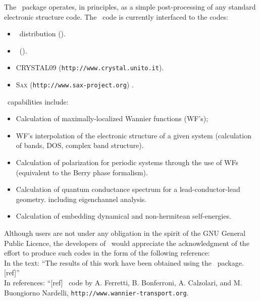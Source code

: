 \noindent The \WANT\ package operates, in principles, as a simple
post-processing of any standard electronic structure code. The \WANT\ code
is currently interfaced to the codes: 
\begin{itemize}
 \item[\mydot]  \QUANTUMESPRESSO\ distribution (\QUANTUMESPRESSOURL).
 \item[\mydot]  \ABINIT\ (\ABINITURL).
 \item[\mydot]  \textsc{CRYSTAL09} ({\tt http://www.crystal.unito.it}).
 \item[\mydot]  \textsc{Sax} ({\tt http://www.sax-project.org}) .
\end{itemize}

\noindent \WANT\ capabilities include:
\begin{itemize}
\item[\mydot]   Calculation of maximally-localized Wannier functions (WF's);
\item[\mydot]   WF's interpolation of the electronic structure of a given system
                (calculation of bands, DOS, complex band structure).
\item[\mydot]   Calculation of polarization for periodic systems through the
                use of WFs (equivalent to the Berry phase formalism).
\item[\mydot]   Calculation of quantum conductance spectrum 
                for a lead-conductor-lead geometry. including
                eigenchannel analysis.
\item[\mydot]   Calculation of embedding dynamical and non-hermitean self-energies.
\end{itemize}

\vspace{0.25in}
 Although users are not under any
obligation in the spirit of the GNU General Public Licence, the
developers of \WANT\ would appreciate the acknowledgment of the
effort to produce such codes in the form of the following
reference:\\

\noindent In the text: ``The results of this work have been
obtained using the \WANT\ package.[ref]''\\

\noindent In references: ``[ref] \WANT\ code by A. Ferretti, B. Bonferroni, A. Calzolari, 
and M. Buongiorno Nardelli, \texttt{http://www.wannier-transport.org}. 
\\
  \vspace{0.25in}

